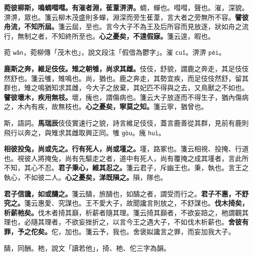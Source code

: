 \textbf{菀彼柳斯，鳴蜩嘒嘒。有漼者淵，萑葦淠淠。}{\footnotesize 蜩，蟬也。嘒嘒，聲也。漼，深貌。淠淠，眾也。箋云柳木茂盛則多蟬，淵深而旁生萑葦，言大者之旁無所不容。}\textbf{譬彼舟流，不知所屆。}{\footnotesize 箋云屆，至也。言今大子不為王及后所容而見放逐，狀如舟之流行，無制之者，不知終所至也。}\textbf{心之憂矣，不遑假寐。}{\footnotesize 箋云遑，暇也。}

\begin{quoting}菀 \texttt{wǎn}，菀柳傳「茂木也」，說文段注「假借為鬱字」。漼 \texttt{cuǐ}。淠淠 \texttt{pèi}。\end{quoting}

\textbf{鹿斯之奔，維足伎伎。雉之朝雊，尚求其雌。}{\footnotesize 伎伎，舒貌，謂鹿之奔走，其足伎伎然舒也。箋云雊，雉鳴也。尚，猶也。鹿之奔走，其勢宜疾，而足伎伎然舒，留其群也，雉之鳴猶知求其雌，今大子之放棄，其妃匹不得與之去，又鳥獸之不如也。}\textbf{譬彼壞木，疾用無枝。}{\footnotesize 壞，瘣也，謂傷病也。箋云大子放逐而不得生子，猶內傷病之，木內有疾，故無枝也。}\textbf{心之憂矣，寧莫之知。}{\footnotesize 箋云寧，猶曾也。}

\begin{quoting}斯，語詞。\textbf{馬瑞辰}伎伎實速行之貌，詩言維足伎伎，蓋言鹿善從其群，見前有鹿則飛行以奔之，與雉求其雌取興正同。雊 \texttt{gòu}。瘣 \texttt{huì}。\end{quoting}

\textbf{相彼投兔，尚或先之。行有死人，尚或墐之。}{\footnotesize 墐，路冢也。箋云相視、投掩、行道也。視彼人將掩兔，尚有先驅走之者，道中有死人，尚有覆掩之成其墐者，言此所不知，其心不忍。}\textbf{君子秉心，維其忍之。}{\footnotesize 箋云君子，斥幽王也。秉，執也。言王之執心，不如彼二人。}\textbf{心之憂矣，涕既隕之。}{\footnotesize 隕，隊也。}

\textbf{君子信讒，如或醻之。}{\footnotesize 箋云醻，旅醻也，如醻之者，謂受而行之。}\textbf{君子不惠，不舒究之。}{\footnotesize 箋云惠愛、究謀也。王不愛大子，故聞讒言則放之，不舒謀也。}\textbf{伐木掎矣，析薪杝矣。}{\footnotesize 伐木者掎其巔，析薪者隨其理。箋云掎其巔者，不欲妄踣之，杝謂觀其理也，必隨其理者，不欲妄挫折之，以言今王之遇大子，不如伐木析薪也。}\textbf{舍彼有罪，予之佗矣。}{\footnotesize 佗，加也。箋云予，我也。舍褒姒讒言之罪，而妄加我大子。}

\begin{quoting}醻，同酬。杝，說文「讀若他」，掎、杝、佗三字為韻。\end{quoting}

